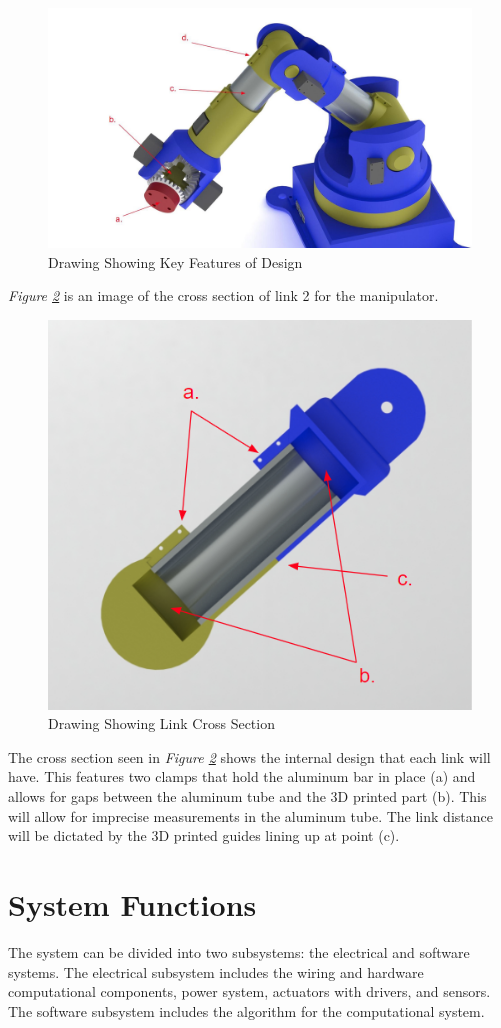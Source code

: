 \documentclass[12pt]{report}
\begin{document}
\begin{figure}[htp]
  \centering
  \includegraphics[frame,width=.75\textwidth]{link_callouts}
  \caption{Drawing Showing Key Features of Design}
  \label{fig:link1}
\end{figure}
\emph{Figure \ref{fig:link2}} is an image of the cross section of link 2 for the manipulator.
\begin{figure}[htp]
  \centering
  \includegraphics[frame,width=.45\textwidth]{link_cross_section}
  \caption{Drawing Showing Link Cross Section}
  \label{fig:link2}
\end{figure}
\newpage
The cross section seen in \emph{Figure \ref{fig:link2}} shows the internal design that each link will have. This features two clamps that hold the aluminum bar in place (a) and allows for gaps between the aluminum tube and the 3D printed part (b). This will allow for imprecise measurements in the aluminum tube. The link distance will be dictated by the 3D printed guides lining up at point (c).

\section{System Functions}
The system can be divided into two subsystems: the electrical and software systems. The electrical subsystem includes the wiring and hardware computational components, power system, actuators with drivers, and sensors. The software subsystem includes the algorithm for the computational system.
\end{document}
